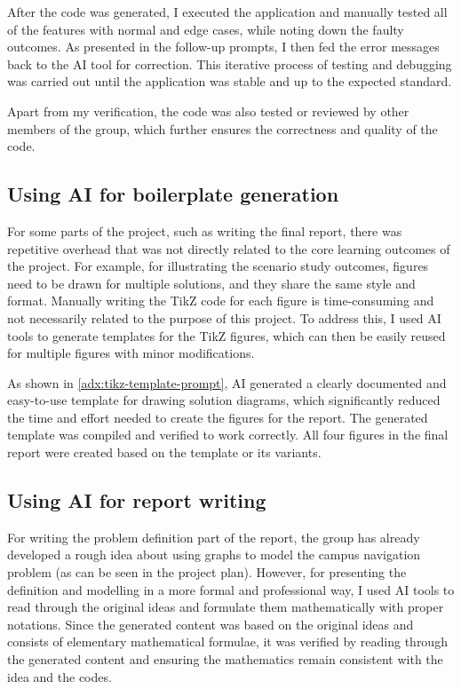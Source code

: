 \documentclass[a4paper,10pt]{amsart}
\begin{document}
After the code was generated, I executed the application and manually tested all of the features with normal and edge cases, while noting down the faulty outcomes.
As presented in the follow-up prompts, I then fed the error messages back to the AI tool for correction.
This iterative process of testing and debugging was carried out until the application was stable and up to the expected standard.

Apart from my verification, the code was also tested or reviewed by other members of the group, which further ensures the correctness and quality of the code.

\subsection{Using AI for boilerplate generation}

For some parts of the project, such as writing the final report, there was repetitive overhead that was not directly related to the core learning outcomes of the project.
For example, for illustrating the scenario study outcomes, figures need to be drawn for multiple solutions, and they share the same style and format.
Manually writing the TikZ code for each figure is time-consuming and not necessarily related to the purpose of this project.
To address this, I used AI tools to generate templates for the TikZ figures, which can then be easily reused for multiple figures with minor modifications.

As shown in \autoref{adx:tikz-template-prompt}, AI generated a clearly documented and easy-to-use template for drawing solution diagrams, which significantly reduced the time and effort needed to create the figures for the report.
The generated template was compiled and verified to work correctly.
All four figures in the final report were created based on the template or its variants.

\subsection{Using AI for report writing}

For writing the problem definition part of the report, the group has already developed a rough idea about using graphs to model the campus navigation problem (as can be seen in the project plan).
However, for presenting the definition and modelling in a more formal and professional way, I used AI tools to read through the original ideas and formulate them mathematically with proper notations.
Since the generated content was based on the original ideas and consists of elementary mathematical formulae, it was verified by reading through the generated content and ensuring the mathematics remain consistent with the idea and the codes.
\end{document}
